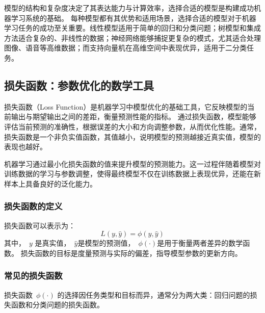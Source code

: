 模型的结构和复杂度决定了其表达能力与计算效率，选择合适的模型是构建成功机器学习系统的基础。
每种模型都有其优势和适用场景，选择合适的模型对于机器学习任务的成功至关重要。线性模型适用于简单的回归和分类问题；树模型和集成方法适合复杂的、非线性的数据；神经网络能够捕捉更复杂的模式，尤其适合处理图像、语音等高维数据；而支持向量机在高维空间中表现优异，适用于二分类任务。

\subsection{损失函数：参数优化的数学工具}
损失函数（Loss Function）是机器学习中模型优化的基础工具，它反映模型的当前输出与期望输出之间的差距，衡量预测性能的指标。
通过损失函数，模型能够评估当前预测的准确性，根据误差的大小和方向调整参数，从而优化性能。通常，损失函数是一个非负实值函数，其值越小，说明模型的预测越接近真实值，模型的表现也越好。

机器学习通过最小化损失函数的值来提升模型的预测能力。这一过程伴随着模型对训练数据的学习与参数调整，使得最终模型不仅在训练数据上表现优异，还能在新样本上具备良好的泛化能力。
 
\subsubsection{损失函数的定义}
损失函数可以表示为：
$$ L(y, \hat{y}) = \phi(y, \hat{y})$$
其中，~$y$ 是真实值，~$\hat{y}$是模型的预测值，~$\phi(\cdot)$是用于衡量两者差异的数学函数。 损失函数的目标是度量预测与实际的偏差，指导模型参数的更新方向。

\subsubsection{常见的损失函数}

损失函数~$\phi(\cdot)$ 的选择因任务类型和目标而异，通常分为两大类：回归问题的损失函数和分类问题的损失函数。
%
%


